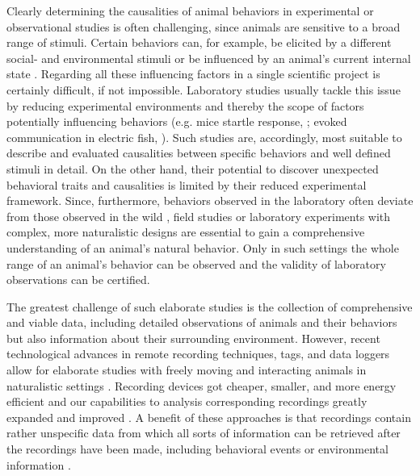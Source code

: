 \documentclass[11pt,pdftex]{article}
\begin{document}
Clearly determining the causalities of animal behaviors in experimental or observational studies is often challenging, since animals are sensitive to a broad range of stimuli. Certain behaviors can, for example, be elicited by a different social- and environmental stimuli or be influenced by an animal's current internal state \citep{Chapman1995, Sapolsky2005, Boon2007, Markham2015}. Regarding all these influencing factors in a single scientific project is certainly difficult, if not impossible. Laboratory studies usually tackle this issue by reducing experimental environments and thereby the scope of factors potentially influencing behaviors (e.g. mice startle response, \citealp{Pantoni2020}; evoked communication in electric fish, \citealp{Bastianetal2001}). Such studies are, accordingly, most suitable to describe and evaluated causalities between specific behaviors and well defined stimuli in detail. On the other hand, their potential to discover unexpected behavioral traits and causalities is limited by their reduced experimental framework. Since, furthermore, behaviors observed in the laboratory often deviate from those observed in the wild \citep{Cheney1995, Rendall1999, Henninger2018}, field studies or laboratory experiments with complex, more naturalistic designs are essential to gain a comprehensive understanding of an animal's natural behavior. Only in such settings the whole range of an animal's behavior can be observed and the validity of laboratory observations can be certified. 

The greatest challenge of such elaborate studies is the collection of comprehensive and viable data, including detailed observations of animals and their behaviors but also information about their surrounding environment. However, recent technological advances in remote recording techniques, tags, and data loggers allow for elaborate studies with freely moving and interacting animals in naturalistic settings \citep{Hughey2018, Mathis2018}. Recording devices got cheaper, smaller, and more energy efficient \citep{Hughey2018, Jolles2021} and our capabilities to analysis corresponding recordings greatly expanded and improved \citep{Dell2014}. A benefit of these approaches is that recordings contain rather unspecific data from which all sorts of information can be retrieved after the recordings have been made, including behavioral events or environmental information \citep{Gomez2014}. 
\end{document}
